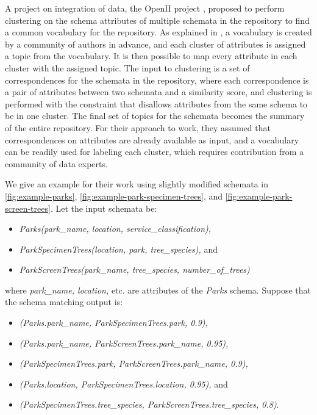 A project on integration of data, the OpenII project \cite{Smith2011Unity}, proposed to perform clustering on the schema attributes of multiple schemata in the repository to find a common vocabulary for the repository. As explained in \cite{Smith2011Unity}, a vocabulary is created by a community of authors in advance, and each cluster of attributes is assigned a topic from the vocabulary. It is then possible to map every attribute in each cluster with the assigned topic. The input to clustering is a set of correspondences for the schemata in the repository, where each correspondence is a pair of attributes between two schemata and a similarity score, and clustering is performed with the constraint that disallows attributes from the same schema to be in one cluster. The final set of topics for the schemata becomes the summary of the entire repository. For their approach to work, they assumed that correspondences on attributes are already available as input, and a vocabulary can be readily used for labeling each cluster, which requires contribution from a community of data experts.

We give an example for their work using slightly modified schemata in \autoref{fig:example-parks}, \autoref{fig:example-park-specimen-trees}, and \autoref{fig:example-park-screen-trees}. Let the input schemata be:
\begin{itemize}
	\item[] \textit{Parks(park\_name, location, service\_classification),}
	\item[] \textit{ParkSpecimenTrees(location, park, tree\_species),} and
	\item[] \textit{ParkScreenTrees(park\_name, tree\_species, number\_of\_trees)}
\end{itemize}
where \textit{park\_name, location,} etc. are attributes of the \textit{Parks} schema. Suppose that the schema matching output is:
\begin{itemize}
	\item[] \textit{(Parks.park\_name, ParkSpecimenTrees.park, 0.9),}
	\item[] \textit{(Parks.park\_name, ParkScreenTrees.park\_name, 0.95),}
	\item[] \textit{(ParkSpecimenTrees.park, ParkScreenTrees.park\_name, 0.9),}
	\item[] \textit{(Parks.location, ParkSpecimenTrees.location, 0.95),} and
	\item[] \textit{(ParkSpecimenTrees.tree\_species, ParkScreenTrees.tree\_species, 0.8)}.
\end{itemize}

